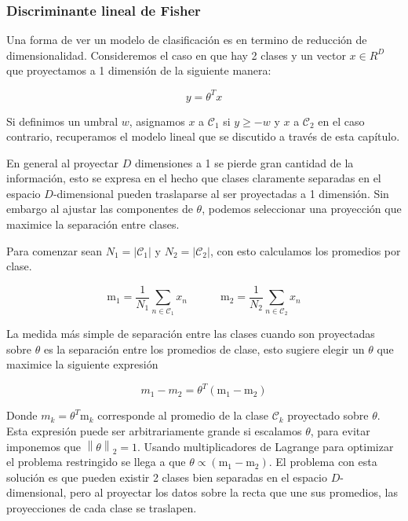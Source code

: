 \subsubsection{Discriminante lineal de Fisher}

Una forma de ver un modelo de clasificación es en termino de reducción de dimensionalidad. Consideremos el caso en que hay 2 clases y un vector $x\in R^D$ que proyectamos a 1 dimensión de la siguiente manera:

\begin{equation}
    y = \theta^Tx
\end{equation}

Si definimos un umbral $w$, asignamos $x$ a $\mathcal{C}_1$ si $y\geq-w$ y $x$ a $\mathcal{C}_2$ en el caso contrario, recuperamos el modelo lineal que se discutido a través de esta capítulo.

En general al proyectar $D$ dimensiones a 1 se pierde gran cantidad de la información, esto se expresa en el hecho que clases claramente separadas en el espacio $D$-dimensional pueden traslaparse al ser proyectadas a 1 dimensión. Sin embargo al ajustar las componentes de $\theta$, podemos seleccionar una proyección que maximice la separación entre clases.

Para comenzar sean $N_1 = |\mathcal{C}_1|$ y $N_2 = |\mathcal{C}_2|$, con esto calculamos los promedios por clase.

\begin{equation}
    \text{m}_1=\frac{1}{N_1}\sum_{n\in\mathcal{C}_1}x_n
    \quad\quad\quad
    \text{m}_2=\frac{1}{N_2}\sum_{n\in\mathcal{C}_2}x_n
\end{equation}

La medida más simple de separación entre las clases cuando son proyectadas sobre $\theta$ es la separación entre los promedios de clase, esto sugiere elegir un $\theta$ que maximice la siguiente expresión

\begin{equation}
    m_1 - m_2 = \theta^T(\text{m}_1-\text{m}_2)
\end{equation}

Donde $m_k= \theta^T\text{m}_k$ corresponde al promedio de la clase $\mathcal{C}_k$ proyectado sobre $\theta$. Esta expresión puede ser arbitrariamente grande si escalamos $\theta$, para evitar imponemos que $\left \| \theta \right \|_2=1$. Usando multiplicadores de Lagrange para optimizar el problema restringido se llega a que $\theta\propto(\text{m}_1-\text{m}_2)$. El problema con esta solución es que pueden existir 2 clases bien separadas en el espacio $D$-dimensional, pero al proyectar los datos sobre la recta que une sus promedios, las proyecciones de cada clase se traslapen.

